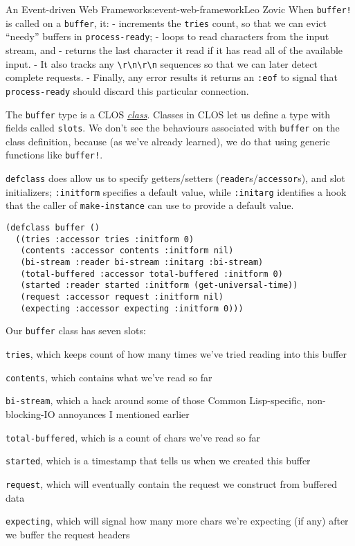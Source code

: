 \begin{aosachapter}{An Event-driven Web Framework}{s:event-web-framework}{Leo Zovic}
When \texttt{buffer!} is called on a \texttt{buffer}, it: - increments
the \texttt{tries} count, so that we can evict ``needy'' buffers in
\texttt{process-ready}; - loops to read characters from the input
stream, and - returns the last character it read if it has read all of
the available input. - It also tracks any
\texttt{\textbackslash{}r\textbackslash{}n\textbackslash{}r\textbackslash{}n}
sequences so that we can later detect complete requests. - Finally, any
error results it returns an \texttt{:eof} to signal that
\texttt{process-ready} should discard this particular connection.

The \texttt{buffer} type is a CLOS
\href{http://www.gigamonkeys.com/book/object-reorientation-classes.html}{\emph{class}}.
Classes in CLOS let us define a type with fields called \texttt{slots}.
We don't see the behaviours associated with \texttt{buffer} on the class
definition, because (as we've already learned), we do that using generic
functions like \texttt{buffer!}.

\texttt{defclass} does allow us to specify getters/setters
(\texttt{reader}s/\texttt{accessor}s), and slot initializers;
\texttt{:initform} specifies a default value, while \texttt{:initarg}
identifies a hook that the caller of \texttt{make-instance} can use to
provide a default value.

\begin{verbatim}
(defclass buffer ()
  ((tries :accessor tries :initform 0)
   (contents :accessor contents :initform nil)
   (bi-stream :reader bi-stream :initarg :bi-stream)
   (total-buffered :accessor total-buffered :initform 0)
   (started :reader started :initform (get-universal-time))
   (request :accessor request :initform nil)
   (expecting :accessor expecting :initform 0)))
\end{verbatim}

Our \texttt{buffer} class has seven slots:

\begin{aosaitemize}

\item
  \texttt{tries}, which keeps count of how many times we've tried
  reading into this buffer
\item
  \texttt{contents}, which contains what we've read so far
\item
  \texttt{bi-stream}, which a hack around some of those Common
  Lisp-specific, non-blocking-IO annoyances I mentioned earlier
\item
  \texttt{total-buffered}, which is a count of chars we've read so far
\item
  \texttt{started}, which is a timestamp that tells us when we created
  this buffer
\item
  \texttt{request}, which will eventually contain the request we
  construct from buffered data
\item
  \texttt{expecting}, which will signal how many more chars we're
  expecting (if any) after we buffer the request headers
\end{aosaitemize}


\end{aosachapter}
